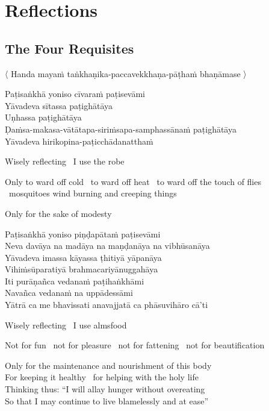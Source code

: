 
\chapter{Reflections}

\section{The Four Requisites}
\label{four-requisites}

\begin{leader}
  〈 Handa mayaṁ taṅkhaṇika-paccavekkhaṇa-pāṭhaṁ bhaṇāmase 〉
\end{leader}

Paṭisaṅkhā yoniso cīvaraṁ paṭisevāmi\\
Yāvadeva sītassa paṭighātāya\\
Uṇhassa paṭighātāya\\
Ḍaṁsa-makasa-vātātapa-siriṁsapa-samphassānaṁ paṭighātāya\\
Yāvadeva hirikopina-paṭicchādanatthaṁ

\begin{english-keepwith}
  Wisely reflecting \breathmark\ I use the robe
\begin{english-hangtogether}
  Only to ward off cold \breathmark\ to ward off heat \breathmark\ to ward off the touch of flies \breathmark\ mosquitoes wind burning and creeping things
\end{english-hangtogether}
  Only for the sake of modesty
\end{english-keepwith}

Paṭisaṅkhā yoniso piṇḍapātaṁ paṭisevāmi\\
Neva davāya na madāya na maṇḍanāya na vibhūsanāya\\
Yāvadeva imassa kāyassa ṭhitiyā yāpanāya\\
Vihiṁsūparatiyā brahmacariyānuggahāya\\
Iti purāṇañca vedanaṁ paṭihaṅkhāmi\\
Navañca vedanaṁ na uppādessāmi\\
Yātrā ca me bhavissati anavajjatā ca phāsuvihāro cā'ti

\begin{english-keepwith}
  Wisely reflecting \breathmark\ I use almsfood
\begin{english-hangtogether}
  Not for fun \breathmark\ not for pleasure \breathmark\ not for fattening \breathmark\ not for beautification
\end{english-hangtogether}
  Only for the maintenance and nourishment of this body\\
  For keeping it healthy \breathmark\ for helping with the holy life\\
  Thinking thus: ``I will allay hunger without overeating\\
  So that I may continue to live blamelessly and at ease''
\end{english-keepwith}

